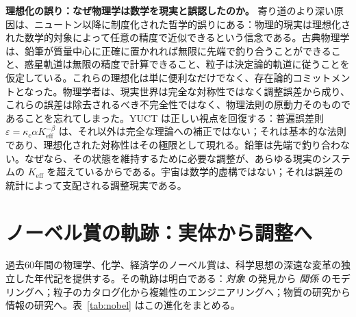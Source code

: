 \documentclass[12pt,a4paper]{article}
\begin{document}
	\textbf{理想化の誤り：なぜ物理学は数学を現実と誤認したのか。} 寄り道のより深い原因は、ニュートン以降に制度化された哲学的誤りにある：物理的現実は理想化された数学的対象によって任意の精度で近似できるという信念である。古典物理学は、鉛筆が質量中心に正確に置かれれば無限に先端で釣り合うことができること、惑星軌道は無限の精度で計算できること、粒子は決定論的軌道に従うことを仮定している。これらの理想化は単に便利なだけでなく、存在論的コミットメントとなった。物理学者は、現実世界は完全な対称性ではなく調整誤差から成り、これらの誤差は除去されるべき不完全性ではなく、物理法則の原動力そのものであることを忘れてしまった。YUCT は正しい視点を回復する：普遍誤差則 \(\varepsilon = \kappa_c \alpha K_{\mathrm{eff}}^{-\beta}\) は、それ以外は完全な理論への補正ではない；それは基本的な法則であり、理想化された対称性はその極限として現れる。鉛筆は先端で釣り合わない。なぜなら、その状態を維持するために必要な調整が、あらゆる現実のシステムの \(K_{\mathrm{eff}}\) を超えているからである。宇宙は数学的虚構ではない；それは誤差の統計によって支配される調整現実である。
	
	\section{ノーベル賞の軌跡：実体から調整へ}
	
	過去60年間の物理学、化学、経済学のノーベル賞は、科学思想の深遠な変革の独立した年代記を提供する。その軌跡は明白である：\emph{対象} の発見から \emph{関係} のモデリングへ；粒子のカタログ化から複雑性のエンジニアリングへ；物質の研究から情報の研究へ。表~\ref{tab:nobel} はこの進化をまとめる。
	
\end{document}
